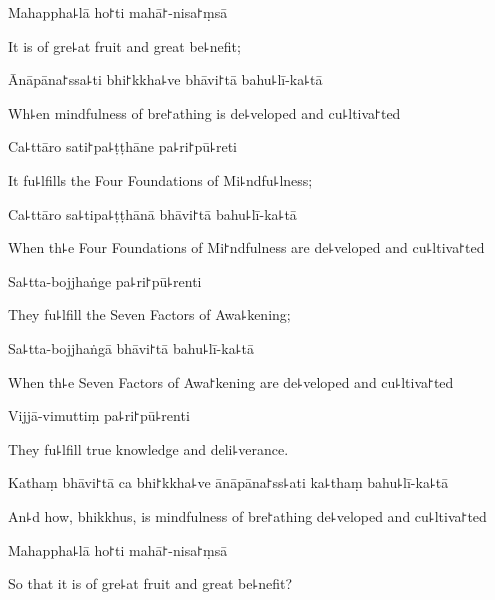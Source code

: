 Mahappha꜕lā ho꜓ti mahā꜓-nisa꜓ṃsā

\begin{english}
  It is of gre꜕at fruit and great be꜕nefit;
\end{english}

Ānāpāna꜓ssa꜕ti bhi꜓kkha꜕ve bhāvi꜓tā bahu꜕lī-ka꜕tā

\begin{english}
  Wh꜕en mindfulness of bre꜓athing is de꜕veloped and cu꜕ltiva꜓ted
\end{english}

Ca꜕ttāro sati꜓pa꜕ṭṭhāne pa꜕ri꜓pū꜕reti

\begin{english}
  It fu꜕lfills the Four Foundations of Mi꜕ndfu꜕lness;
\end{english}

Ca꜕ttāro sa꜕tipa꜕ṭṭhānā bhāvi꜓tā bahu꜕lī-ka꜕tā

\begin{english}
  When th꜕e Four Foundations of Mi꜓ndfulness are de꜕veloped and cu꜕ltiva꜓ted
\end{english}

Sa꜕tta-bojjhaṅge pa꜕ri꜓pū꜕renti

\begin{english}
  They fu꜕lfill the Seven Factors of Awa꜕kening;
\end{english}

Sa꜕tta-bojjhaṅgā bhāvi꜓tā bahu꜕lī-ka꜕tā

\begin{english}
  When th꜕e Seven Factors of Awa꜓kening are de꜕veloped and cu꜕ltiva꜓ted
\end{english}

Vijjā-vimuttiṃ pa꜕ri꜓pū꜕renti

\begin{english}
  They fu꜕lfill true knowledge and deli꜕verance.
\end{english}

Kathaṃ bhāvi꜓tā ca bhi꜓kkha꜕ve ānāpāna꜓ss꜕ati ka꜕thaṃ bahu꜕lī-ka꜕tā

\begin{english}
  An꜕d how, bhikkhus, is mindfulness of bre꜓athing de꜕veloped and cu꜕ltiva꜓ted
\end{english}

Mahappha꜕lā ho꜓ti mahā꜓-nisa꜓ṃsā

\begin{english}
  So that it is of gre꜕at fruit and great be꜕nefit?
\end{english}


